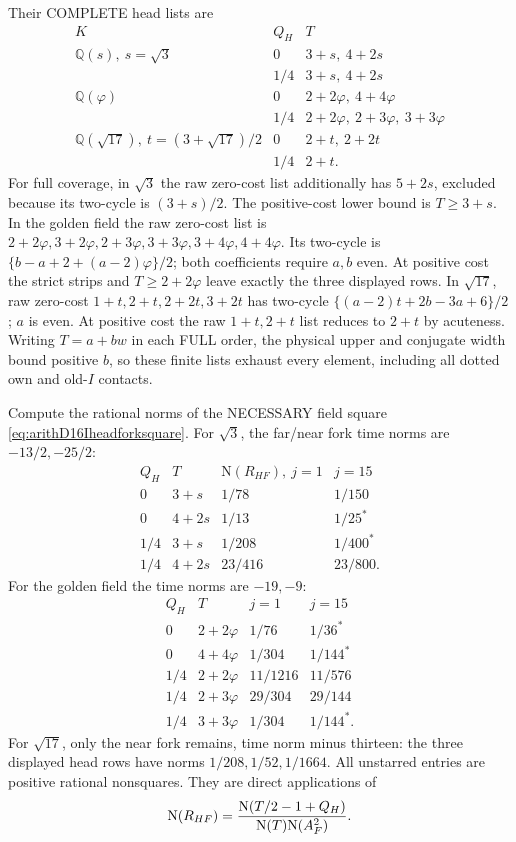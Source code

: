 Their COMPLETE head lists are
\[
\begin{array}{c|c|l}
 K&Q_H&T\\ \hline
 \mathbb Q(s),\ s=\sqrt3&0&3+s,\ 4+2s\\
 &1/4&3+s,\ 4+2s\\
 \mathbb Q(\varphi)&0&2+2\varphi,\ 4+4\varphi\\
 &1/4&2+2\varphi,\ 2+3\varphi,\ 3+3\varphi\\
 \mathbb Q(\sqrt{17}),\ t=(3+\sqrt{17})/2&0&2+t,\ 2+2t\\
 &1/4&2+t .
\end{array}
\]
For full coverage, in \(\sqrt3\) the
raw zero-cost list additionally has
\(5+2s\), excluded because its two-cycle
is \((3+s)/2\).
The positive-cost lower bound is \(T\ge3+s\).
In the golden field the raw zero-cost
list is
\(2+2\varphi,3+2\varphi,2+3\varphi,
3+3\varphi,3+4\varphi,4+4\varphi\).
Its two-cycle is
\(\{b-a+2+(a-2)\varphi\}/2\);
both coefficients require \(a,b\) even.
At positive cost the strict strips and
\(T\ge2+2\varphi\) leave exactly the
three displayed rows.
In \(\sqrt{17}\), raw zero-cost
\(1+t,2+t,2+2t,3+2t\) has two-cycle
\(\{(a-2)t+2b-3a+6\}/2\);
\(a\) is even.
At positive cost the raw \(1+t,2+t\)
list reduces to \(2+t\) by acuteness.
Writing \(T=a+bw\) in each FULL order,
the physical upper and conjugate width
bound positive \(b\), so these finite
lists exhaust every element, including
all dotted own and old-\(I\) contacts.

Compute the rational norms of the
NECESSARY field square
\eqref{eq:arithD16Iheadforksquare}.
For \(\sqrt3\), the far/near fork
time norms are \(-13/2,-25/2\):
\[
\begin{array}{c|c|cc}
 Q_H&T&\mathrm N(R_{HF}),\ j=1&j=15\\ \hline
0&3+s&1/78&1/150\\
0&4+2s&1/13&1/25^*\\
1/4&3+s&1/208&1/400^*\\
1/4&4+2s&23/416&23/800 .
\end{array}
\]
For the golden field the time norms
are \(-19,-9\):
\[
\begin{array}{c|c|cc}
 Q_H&T&j=1&j=15\\ \hline
0&2+2\varphi&1/76&1/36^*\\
0&4+4\varphi&1/304&1/144^*\\
1/4&2+2\varphi&11/1216&11/576\\
1/4&2+3\varphi&29/304&29/144\\
1/4&3+3\varphi&1/304&1/144^* .
\end{array}
\]
For \(\sqrt{17}\), only the near
fork remains, time norm minus thirteen:
the three displayed head rows have
norms \(1/208,1/52,1/1664\).
All unstarred entries are positive
rational nonsquares.
They are direct applications of
\[
 \mathrm N(R_{HF})=
 {\mathrm N(T/2-1+Q_H)\over\mathrm N(T)\mathrm N(A_F^2)} .
\]

